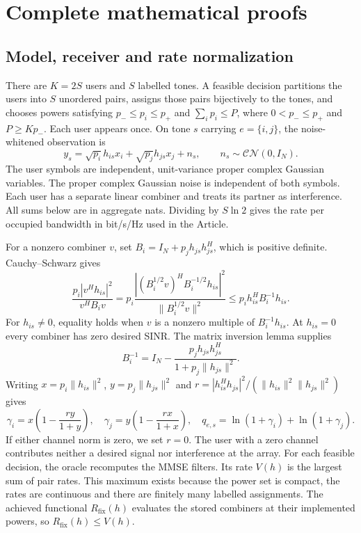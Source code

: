 \documentclass[10pt,letterpaper]{article}
\begin{document}
\FloatBarrier
\section{Complete mathematical proofs}
\label{supp:proofs}

\subsection{Model, receiver and rate normalization}
There are $K=2S$ users and $S$ labelled tones. A feasible decision partitions the users into $S$ unordered pairs, assigns those pairs bijectively to the tones, and chooses powers satisfying $p_-\le p_i\le p_+$ and $\sum_i p_i\le P$, where $0<p_-\le p_+$ and $P\ge Kp_-$. Each user appears once. On tone $s$ carrying $e=\{i,j\}$, the noise-whitened observation is
\begin{equation}
 y_s=\sqrt{p_i}h_{is}x_i+\sqrt{p_j}h_{js}x_j+n_s,
 \qquad n_s\sim\mathcal{CN}(0,I_N).
 \label{supp:observation}
\end{equation}
The user symbols are independent, unit-variance proper complex Gaussian variables. The proper complex Gaussian noise is independent of both symbols. Each user has a separate linear combiner and treats its partner as interference. All sums below are in aggregate nats. Dividing by $S\ln2$ gives the rate per occupied bandwidth in bit/s/Hz used in the Article.

For a nonzero combiner $v$, set $B_i=I_N+p_jh_{js}h_{js}^H$, which is positive definite. Cauchy--Schwarz gives
\begin{equation}
 \frac{p_i|v^Hh_{is}|^2}{v^HB_iv}
 =p_i\frac{|(B_i^{1/2}v)^H B_i^{-1/2}h_{is}|^2}
                 {\|B_i^{1/2}v\|^2}
 \le p_i h_{is}^HB_i^{-1}h_{is}.
 \label{supp:mmse-cs}
\end{equation}
For $h_{is}\ne0$, equality holds when $v$ is a nonzero multiple of $B_i^{-1}h_{is}$. At $h_{is}=0$ every combiner has zero desired SINR. The matrix inversion lemma supplies
\begin{equation}
 B_i^{-1}=I_N-\frac{p_jh_{js}h_{js}^H}{1+p_j\|h_{js}\|^2}.
 \label{supp:mmse-inverse}
\end{equation}
Writing $x=p_i\|h_{is}\|^2$, $y=p_j\|h_{js}\|^2$ and
$r=|h_{is}^Hh_{js}|^2/(\|h_{is}\|^2\|h_{js}\|^2)$ gives
\begin{equation}
 \gamma_i=x\left(1-\frac{ry}{1+y}\right),\quad
 \gamma_j=y\left(1-\frac{rx}{1+x}\right),\quad
 q_{e,s}=\ln(1+\gamma_i)+\ln(1+\gamma_j).
 \label{supp:mmse-rate}
\end{equation}
If either channel norm is zero, we set $r=0$. The user with a zero channel contributes neither a desired signal nor interference at the array. For each feasible decision, the oracle recomputes the MMSE filters. Its rate $V(h)$ is the largest sum of pair rates. This maximum exists because the power set is compact, the rates are continuous and there are finitely many labelled assignments. The achieved functional $R_{\mathrm{fix}}(h)$ evaluates the stored combiners at their implemented powers, so $R_{\mathrm{fix}}(h)\le V(h)$.
\end{document}
